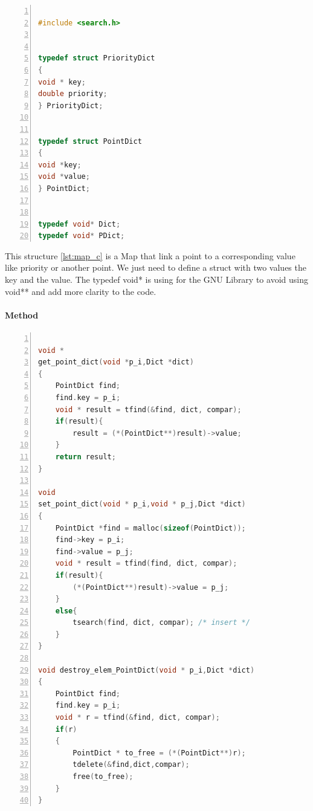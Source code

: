 \begin{lstlisting}[float=h,language=C, % Spécifie le langage du code
caption={Map C implementation}, % Légende du listing
label=lst:map_c, % Étiquette pour référencer le listing
numbers=left,
numberstyle=\tiny\color{gray},
stepnumber=1,
frame=single,
breaklines=true,
postbreak=\mbox{\textcolor{red}{$\hookrightarrow$}\space},
showstringspaces=false
]

#include <search.h>


typedef struct PriorityDict
{
void * key;
double priority;
} PriorityDict;


typedef struct PointDict
{
void *key;
void *value;
} PointDict;


typedef void* Dict;
typedef void* PDict;

\end{lstlisting}
 

This structure \ref{lst:map_c} is a Map that link a point to a corresponding value like priority or another point. We just need to define a struct with two values the key and the value. The typedef void* is using for the GNU Library to avoid using void** and add more clarity to the code.

\paragraph{Method}

\begin{lstlisting}[float=h,language=C, % Spécifie le langage du code
caption={Point Map Methods}, % Légende du listing
label=lst:pmap_c, % Étiquette pour référencer le listing
numbers=left,
numberstyle=\tiny\color{gray},
stepnumber=1,
frame=single,
breaklines=true,
postbreak=\mbox{\textcolor{red}{$\hookrightarrow$}\space},
showstringspaces=false
]

void *
get_point_dict(void *p_i,Dict *dict)
{
	PointDict find;
	find.key = p_i;
	void * result = tfind(&find, dict, compar);
	if(result){
		result = (*(PointDict**)result)->value;
	}
	return result;
}

void
set_point_dict(void * p_i,void * p_j,Dict *dict)
{
	PointDict *find = malloc(sizeof(PointDict));
	find->key = p_i;
	find->value = p_j;
	void * result = tfind(find, dict, compar);
	if(result){
		(*(PointDict**)result)->value = p_j;
	}
	else{
		tsearch(find, dict, compar); /* insert */
	}
}

void destroy_elem_PointDict(void * p_i,Dict *dict)
{
	PointDict find;
	find.key = p_i;
	void * r = tfind(&find, dict, compar);
	if(r)
	{
		PointDict * to_free = (*(PointDict**)r);
		tdelete(&find,dict,compar);
		free(to_free);
	}
}

\end{lstlisting} 

